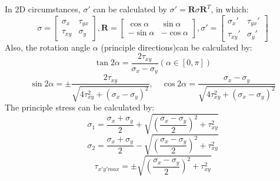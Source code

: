 \documentclass[en,hazy,cyan,8pt,normal]{elegantnote}
\begin{document}
    In 2D circumstances, $\sigma'$ can be calculated by $\sigma'=\mathbf{R}\sigma \mathbf{R}^T$, in which:
    \begin{equation}\label{eq:011}
      \sigma=
      \begin{bmatrix}
        \sigma_x & \tau_{yx}\\
        \tau_{xy} & \sigma_y
      \end{bmatrix}, 
      \mathbf{R}=
      \begin{bmatrix}
        \cos\alpha & \sin\alpha\\
        -\sin\alpha & -\cos\alpha
      \end{bmatrix},
      \sigma'=
      \begin{bmatrix}
        \sigma_x' & \tau_{yx}'\\
        \tau_{xy}' & \sigma_y'
      \end{bmatrix}
    \end{equation}
    Also, the rotation angle $\alpha$ (principle directions)can be calculated by:
    \begin{equation}\label{eq:012}
      \tan2\alpha=\frac{2\tau_{xy}}{\sigma_x-\sigma_y}(\alpha\in[0,\pi])
    \end{equation}
    \begin{equation}\label{eq:013}
      \sin2\alpha=\pm\frac{2\tau_{xy}}{\sqrt{4\tau_{xy}^2+(\sigma_x-\sigma_y)^2}}, \quad \cos2\alpha=\frac{\sigma_x-\sigma_y}{\sqrt{4\tau_{xy}^2+(\sigma_x-\sigma_y)^2}}
    \end{equation}
    The principle stress can be calculated by:
    \begin{equation}\label{eq:014}
      \sigma_{1}=\frac{\sigma_x+\sigma_y}{2} + \sqrt{\left(\frac{\sigma_x-\sigma_y}{2}\right)^2+\tau_{xy}^2}
    \end{equation}
    \begin{equation}\label{eq:015}
      \sigma_{2}=\frac{\sigma_x+\sigma_y}{2} - \sqrt{\left(\frac{\sigma_x-\sigma_y}{2}\right)^2+\tau_{xy}^2}
    \end{equation}
    \begin{equation}\label{eq:016}
      \tau_{x'y'max}=\pm\sqrt{\left(\frac{\sigma_x-\sigma_y}{2}\right)^2+\tau_{xy}^2}
    \end{equation}
  
\end{document}
